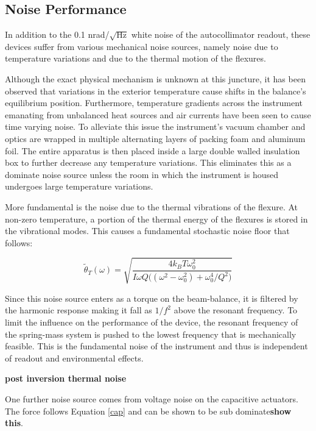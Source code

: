 \documentclass [12pt, proquest]{uwthesis}[2019]
\begin{document}
\subsection{Noise Performance}

In addition to the 0.1 nrad/$\sqrt{\text{Hz}}$ white noise of the autocollimator readout, these devices suffer from various mechanical noise sources, namely noise due to temperature variations and due to the thermal motion of the flexures.

Although the exact physical mechanism is unknown at this juncture, it has been observed that variations in the exterior temperature cause shifts in the balance's equilibrium position. Furthermore, temperature gradients across the instrument emanating from unbalanced heat sources and air currents have been seen to cause time varying noise. To alleviate this issue the instrument's vacuum chamber and optics are wrapped in multiple alternating layers of packing foam and aluminum foil. The entire apparatus is then placed inside a large double walled insulation box to further decrease any temperature variations. This eliminates this as a dominate noise source unless the room in which the instrument is housed undergoes large temperature variations.

More fundamental is the noise due to the thermal vibrations of the flexure. At non-zero temperature, a portion of the thermal energy of the flexures is stored in the vibrational modes. This causes a fundamental stochastic noise floor that follows\cite{thermal}:

\begin{equation}
\tilde\theta_T(\omega)=\sqrt{\frac{4 k_B T \omega_0^2}{I \omega Q\big((\omega^2-\omega_0^2)+\omega_0^4/Q^2\big)}}
\end{equation}

Since this noise source enters as a torque on the beam-balance, it is filtered by the harmonic response making it fall as $1/f^2$ above the resonant frequency. To limit the influence on the performance of the device, the resonant frequency of the spring-mass system is pushed to the lowest frequency that is mechanically feasible. This is the fundamental noise of the instrument and thus is independent of readout and environmental effects.


 \textbf{post inversion thermal noise}
 
 One further noise source comes from voltage noise on the capacitive actuators. The force follows Equation \ref{cap} and can be shown to be sub dominate\textbf{show this}.
 
\end{document}
